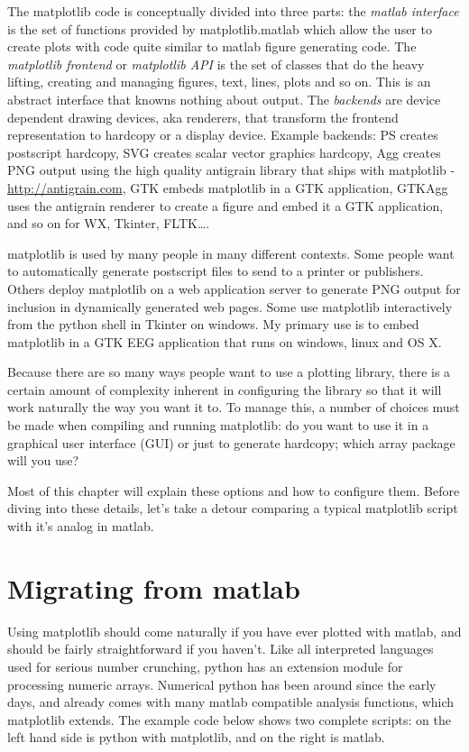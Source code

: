 \documentclass[]{book}
\begin{document}
The matplotlib code is conceptually divided into three parts: the
\textit{matlab interface} is the set of functions provided by
matplotlib.matlab which allow the user to create plots with code quite
similar to matlab figure generating code.  The \textit{matplotlib
  frontend} or \textit{matplotlib API} is the set of classes that do
the heavy lifting, creating and managing figures, text, lines, plots
and so on.  This is an abstract interface that knowns nothing about
output.  The \textit{backends} are device dependent drawing devices,
aka renderers, that transform the frontend representation to hardcopy
or a display device.  Example backends: PS creates postscript
hardcopy, SVG creates scalar vector graphics hardcopy, Agg creates PNG
output using the high quality antigrain library that ships with
matplotlib - \url{http://antigrain.com}, GTK embeds matplotlib in a
GTK application, GTKAgg uses the antigrain renderer to create a figure
and embed it a GTK application, and so on for WX, Tkinter, FLTK\dots.

matplotlib is used by many people in many different contexts.  Some
people want to automatically generate postscript files to send to a
printer or publishers.  Others deploy matplotlib on a web application
server to generate PNG output for inclusion in dynamically generated
web pages.  Some use matplotlib interactively from the python shell in
Tkinter on windows.  My primary use is to embed matplotlib in a GTK
EEG application that runs on windows, linux and OS X.

Because there are so many ways people want to use a plotting library,
there is a certain amount of complexity inherent in configuring the
library so that it will work naturally the way you want it to.  To
manage this, a number of choices must be made when compiling and
running matplotlib: do you want to use it in a graphical user
interface (GUI) or just to generate hardcopy; which array package will
you use?  

Most of this chapter will explain these options and how to configure
them.  Before diving into these details, let's take a detour comparing
a typical matplotlib script with it's analog in matlab.

\section{Migrating from matlab}
\label{sec:migrating}

Using matplotlib should come naturally if you have ever plotted with
matlab, and should be fairly straightforward if you haven't.  Like all
interpreted languages used for serious number crunching, python has an
extension module for processing numeric arrays.  Numerical python has
been around since the early days, and already comes with many matlab
compatible analysis functions, which matplotlib extends.  The example
code below shows two complete scripts: on the left hand side is python
with matplotlib, and on the right is matlab.  
\end{document}
